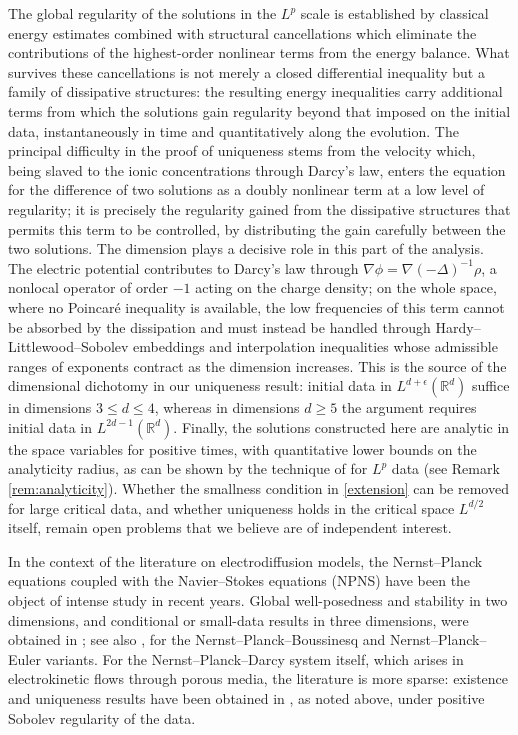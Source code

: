\documentclass[11pt,reqno]{amsart}
\begin{document}
The global regularity of the solutions in the $L^{p}$ scale is
established by classical energy estimates combined with structural
cancellations which eliminate the contributions of the highest-order
nonlinear terms from the energy balance. What survives these
cancellations is not merely a closed differential inequality but a
family of dissipative structures: the resulting energy inequalities
carry additional terms from which the
solutions gain regularity beyond that imposed on the initial data,
instantaneously in time and quantitatively along the evolution. The
principal difficulty in the proof of uniqueness stems from the
velocity which, being slaved to the ionic concentrations through
Darcy's law, enters the equation for the difference of two solutions
as a doubly nonlinear term at a low level of regularity; it is
precisely the regularity gained from the dissipative structures that
permits this term to be controlled, by distributing the gain
carefully between the two solutions. The dimension plays a decisive
role in this part of the analysis. The electric potential contributes
to Darcy's law through $\nabla\phi = \nabla(-\Delta)^{-1}\rho$, a
nonlocal operator of order $-1$ acting on the charge density; on the
whole space, where no Poincar\'e inequality is available, the low
frequencies of this term cannot be absorbed by the dissipation and
must instead be handled through Hardy--Littlewood--Sobolev embeddings
and interpolation inequalities whose admissible ranges of exponents
contract as the dimension increases. This is the source of the
dimensional dichotomy in our uniqueness result: initial data in
$L^{d+\epsilon}(\mathbb{R}^d)$ suffice in dimensions $3 \le d \le 4$,
whereas in dimensions $d \ge 5$ the argument requires initial data in
$L^{2d-1}(\mathbb{R}^d)$. Finally, the solutions
constructed here are analytic in the space variables for positive
times, with quantitative lower bounds on the analyticity radius, as
can be shown by the technique of \cite{grujic1998space} for
$L^p$ data (see Remark \ref{rem:analyticity}). Whether the smallness condition in 
\eqref{extension} can be removed for large critical data, and
whether uniqueness holds in the critical space $L^{d/2}$ itself,
remain open problems that we believe are of independent interest.

In the context of the literature on
electrodiffusion models, the Nernst--Planck equations coupled with the
Navier--Stokes equations (NPNS) have been the object of intense study
in recent years. Global well-posedness and stability in two dimensions,
and conditional or small-data results in three dimensions, were
obtained in \cite{constantin2019nernst, constantin2021nernst, fischer2017global, abdo2022space, lee2021global, constantin2022nernst}; see also
\cite{abdo2026three, ignatova2021global}, for the
Nernst--Planck--Boussinesq and Nernst--Planck--Euler variants. For the
Nernst--Planck--Darcy system itself, which arises in electrokinetic
flows through porous media, the literature is more sparse: existence and
uniqueness results have been obtained in \cite{abdo2026long, herz2012existence, ignatova2022global}, as noted above, under positive Sobolev regularity of the data.
\end{document}
